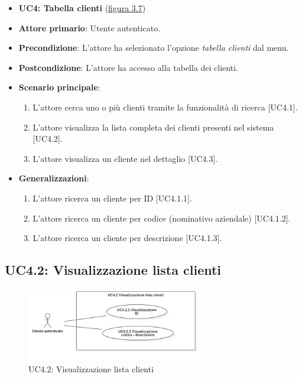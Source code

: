\begin{itemize}
\item \textbf{UC4: Tabella clienti} ({\hyperref[fig:UC4]{figura 3.7}})
\item \textbf{Attore primario}: Utente autenticato.
\item \textbf{Precondizione}: L'attore ha selezionato l'opzione \textit{tabella clienti} dal menu.
\item \textbf{Postcondizione}: L'attore ha accesso alla tabella dei clienti.
\item \textbf{Scenario principale}: 
\begin{enumerate}
\item L'attore cerca uno o più clienti tramite la funzionalità di ricerca [UC4.1].
\item L'attore visualizza la lista completa dei clienti presenti nel sistema [UC4.2].
\item L'attore visualizza un cliente nel dettaglio [UC4.3].
\end{enumerate}
\item \textbf{Generalizzazioni}:
\begin{enumerate}
\item L'attore ricerca un cliente per ID [UC4.1.1].
\item L'attore ricerca un cliente per codice (nominativo aziendale) [UC4.1.2].
\item L'attore ricerca un cliente per descrizione [UC4.1.3].
\end{enumerate}
\end{itemize}

\pagebreak

\subsection{UC4.2: Visualizzazione lista clienti}
\begin{figure}[!h]
\centering
\includegraphics[width=300px]{../images/UC/.jpeg/UC4.2-visualizzazioneListaClienti.jpg}
\caption{UC4.2: Visualizzazione lista clienti}
\label{fig:UC4.2}
\end{figure}

